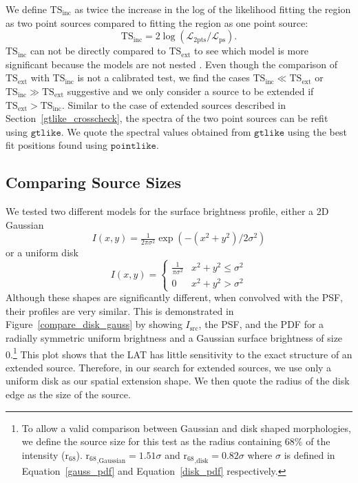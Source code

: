 \documentclass[12pt,preprint]{aastex}
\newcommand{\tsext}{{\ensuremath{\text{TS}_{\text{ext}}}}\xspace}
\newcommand{\tsinc}{\ensuremath{\text{TS}_{\text{inc}}}\xspace}
\newcommand{\likelihood}{\ensuremath{\mathcal{L}}\xspace}
\newcommand{\rsixeight}{{\ensuremath{\text{r}_{68}}}\xspace}
\newcommand{\gtlike}{\ensuremath{\mathtt{gtlike}}\xspace}
\newcommand{\pointlike}{\ensuremath{\mathtt{pointlike}}\xspace}
\begin{document}
We define \tsinc as twice the increase in the log of the likelihood fitting the
region as two point sources compared to fitting the region as one point
source: 
\begin{equation}
  \tsinc=2\log(\likelihood_\text{2pts}/\likelihood_\text{ps}).
\end{equation} 
\tsinc can not be directly compared to \tsext to see which
model is more significant because the models are not nested
\citep{statistics_with_care}. Even though the comparison of \tsext with
\tsinc is not a calibrated test, we find the cases $\tsinc \ll \tsext$
or $\tsinc\gg\tsext$ suggestive and we only consider a source to be
extended if $\tsext>\tsinc$.
Similar to the case of extended sources described in Section~\ref{gtlike_crosscheck},
the spectra of the two point sources can be refit using \gtlike.
We quote the spectral values obtained from \gtlike using the best fit
positions found using \pointlike.  

\subsection{Comparing Source Sizes}

\label{compare_source_size}

We tested two different models for the
surface brightness profile, either a 2D Gaussian
\begin{equation}\label{gauss_pdf}
  I(x,y)=\tfrac{1}{2\pi\sigma^2}\exp\left(-(x^2+y^2)/2\sigma^2\right)
\end{equation}
or a uniform disk
\begin{equation}\label{disk_pdf}
  I(x,y)=
  \begin{cases}
    \frac{1}{\pi\sigma^2} & x^2+y^2\le\sigma^2 \\
    0                      & x^2+y^2>\sigma^2
  \end{cases}
\end{equation}
Although these shapes are significantly different, when convolved
with the PSF, their profiles are very similar.  
This is demonstrated in 
Figure~\ref{compare_disk_gauss}
by showing $I_\text{src}$, the PSF, and the PDF for
a radially symmetric uniform brightness and a Gaussian surface brightness of size 0.\footnote{To
allow a valid comparison between Gaussian and disk shaped morphologies,
we define the source size for this test as the radius containing
68\% of the intensity ($\rsixeight$).  $\rsixeight_\text{,Gaussian}=1.51\sigma$
and $\rsixeight_\text{,disk}=0.82\sigma$ where $\sigma$
is defined in Equation~\ref{gauss_pdf} and
Equation~\ref{disk_pdf} respectively.} This plot shows that the LAT 
has little sensitivity to
the exact structure of an extended source.
Therefore, in our
search for extended sources, we use only a uniform
disk as our spatial extension shape. We then quote the radius of the
disk edge as the size of the source.
\end{document}
